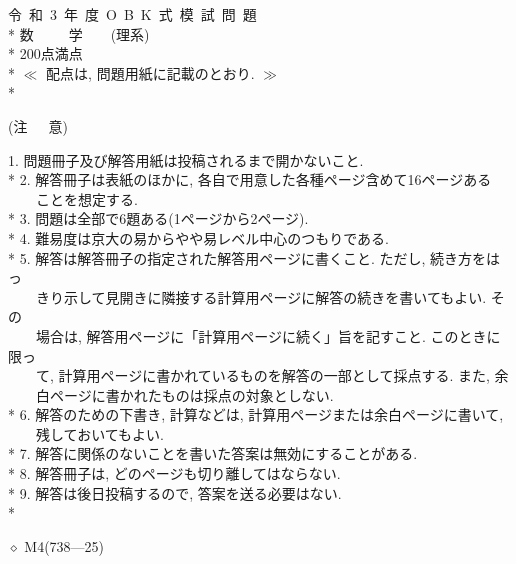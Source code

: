 \documentclass{article}
\begin{document}
\pagestyle{empty} 
\begin{center}
{\LARGE 令\ 和\ 3\ 年\ 度\ O\ B\ K\ 式\ 模\ 試\ 問\ 題 }\vspace{0.5in}\\*
{\huge 数\ \ \ \ \ 学\ \ \ \ (理系)}\vspace{0.5in}\\*
200点満点\vspace{0.1in}\\*
 $\ll$ 配点は, 問題用紙に記載のとおり. $\gg$ \vspace{0.5in}\\*
\end{center}
\begin{flushleft}
(注\ \ \ 意)\\
\end{flushleft}
1. 問題冊子及び解答用紙は投稿されるまで開かないこと.\vspace{0.1in}\\*
2. 解答冊子は表紙のほかに, 各自で用意した各種ページ含めて16ページある\vspace{0.1in}\\
\ \ \ \ ことを想定する.\vspace{0.1in}\\*
3. 問題は全部で6題ある(1ページから2ページ).\vspace{0.1in}\\*
4. 難易度は京大の易からやや易レベル中心のつもりである.\vspace{0.1in}\\*
5. 解答は解答冊子の指定された解答用ページに書くこと. ただし, 続き方をはっ\vspace{0.1in}\\
\ \ \ \ きり示して見開きに隣接する計算用ページに解答の続きを書いてもよい. その\vspace{0.1in}\\
\ \ \ \ 場合は, 解答用ページに「計算用ページに続く」旨を記すこと. このときに限っ\vspace{0.1in}\\
\ \ \ \ て, 計算用ページに書かれているものを解答の一部として採点する. また, 余\vspace{0.1in}\\
\ \ \ \ 白ページに書かれたものは採点の対象としない.\vspace{0.1in}\\*
6. 解答のための下書き, 計算などは, 計算用ページまたは余白ページに書いて,\vspace{0.1in}\\
\ \ \ \ 残しておいてもよい.\vspace{0.1in}\\*
7. 解答に関係のないことを書いた答案は無効にすることがある.\vspace{0.1in}\\*
8. 解答冊子は, どのページも切り離してはならない.\vspace{0.1in}\\*
9. 解答は後日投稿するので, 答案を送る必要はない. \vspace{0.5in}\\*
\begin{flushright}
{\scriptsize $\diamond$ M4(738---25)}
\end{flushright}
\end{document}
